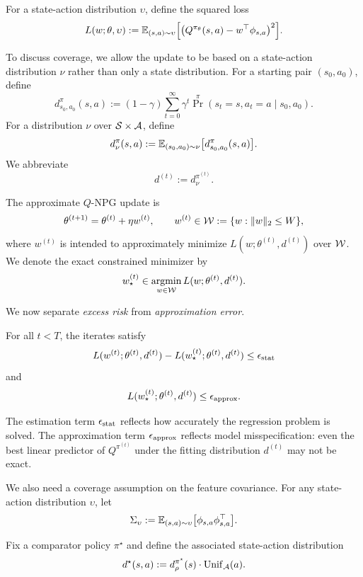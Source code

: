 For a state-action distribution $\upsilon$, define the squared loss
\[
L(w;\theta,\upsilon)
:=
\mathbb{E}_{(s,a)\sim \upsilon}
\Big[
\big(Q^{\pi_\theta}(s,a)-w^\top \phi_{s,a}\big)^2
\Big].
\]

To discuss coverage, we allow the update to be based on a state-action distribution
$\nu$ rather than only a state distribution. For a starting pair $(s_0,a_0)$, define
\begin{equation}\label{eqn:c_def}
d_{s_0,a_0}^\pi(s,a)
:=
(1-\gamma)\sum_{t=0}^\infty \gamma^t
\Pr^\pi(s_t=s,a_t=a\mid s_0,a_0).
\end{equation}
For a distribution $\nu$ over $\mathcal{S}\times\mathcal{A}$, define
\[
d_\nu^\pi(s,a)
:=
\mathbb{E}_{(s_0,a_0)\sim \nu}\big[d_{s_0,a_0}^\pi(s,a)\big].
\]
We abbreviate
\[
d^{(t)}:=d_\nu^{\pi^{(t)}}.
\]

The approximate $Q$-NPG update is
\begin{equation}\label{eq:q-npg}
\theta^{(t+1)}
=
\theta^{(t)}+\eta w^{(t)},
\qquad
w^{(t)}\in \mathcal{W}:=\{w:\|w\|_2\le W\},
\end{equation}
where $w^{(t)}$ is intended to approximately minimize
$L(w;\theta^{(t)},d^{(t)})$ over $\mathcal{W}$.
We denote the exact constrained minimizer by
\[
w_\star^{(t)}\in \operatorname*{argmin}_{w\in \mathcal{W}} L(w;\theta^{(t)},d^{(t)}).
\]

We now separate \emph{excess risk} from \emph{approximation error}.

\begin{assumption}
\label{assum:approx_est}
For all $t<T$, the iterates satisfy
\[
L(w^{(t)};\theta^{(t)},d^{(t)})
-
L(w_\star^{(t)};\theta^{(t)},d^{(t)})
\le \epsilon_{\mathrm{stat}}
\]
and
\[
L(w_\star^{(t)};\theta^{(t)},d^{(t)})\le \epsilon_{\mathrm{approx}}.
\]
\end{assumption}

The estimation term $\epsilon_{\mathrm{stat}}$ reflects how accurately the regression problem is solved.
The approximation term $\epsilon_{\mathrm{approx}}$ reflects model misspecification: even the best linear
predictor of $Q^{\pi^{(t)}}$ under the fitting distribution $d^{(t)}$ may not be exact.

We also need a coverage assumption on the feature covariance. For any state-action distribution
$\upsilon$, let
\[
\Sigma_\upsilon := \mathbb{E}_{(s,a)\sim \upsilon}\big[\phi_{s,a}\phi_{s,a}^\top\big].
\]

Fix a comparator policy $\pi^\star$ and define the associated state-action distribution
\[
d^\star(s,a)
:=
d_\rho^{\pi^\star}(s)\cdot \mathrm{Unif}_{\mathcal{A}}(a).
\]

